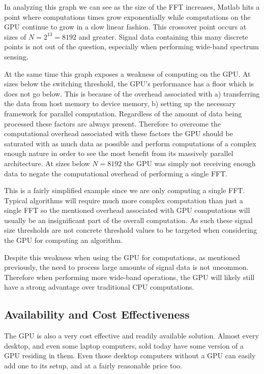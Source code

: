 In analyzing this graph we can see as the size of the FFT increases, Matlab hits a point where computations times grow exponentially while computations on the GPU continue to grow in a slow linear fashion.  This crossover point occurs at sizes of $N = 2^{13} = 8192$ and greater.  Signal data containing this many discrete points is not out of the question, especially when performing wide-band spectrum sensing.  

At the same time this graph exposes a weakness of computing on the GPU.  At sizes below the switching threshold, the GPU's performance has a floor which is does not go below.  This is because of the overhead associated with a) transferring the data from host memory to device memory, b) setting up the necessary framework for parallel computation.  Regardless of the amount of data being processed these factors are always present. Therefore to overcome the computational overhead associated with these factors the GPU should be saturated with as much data as possible and perform computations of a complex enough nature in order to see the most benefit from its massively parallel architecture.  At sizes below $N = 8192$ the GPU was simply not receiving enough data to negate the computational overhead of performing a single FFT.

This is a fairly simplified example since we are only computing a single FFT.  Typical algorithms will require much more complex computation than just a single FFT so the mentioned overhead associated with GPU computations will usually be an insignificant part of the overall computation.  As such these signal size thresholds are not concrete threshold values to be targeted when considering the GPU for computing an algorithm.

Despite this weakness when using the GPU for computations, as mentioned previously, the need to process large amounts of signal data is not uncommon.  Therefore when performing more wide-band operations, the GPU will likely still have a strong advantage over traditional CPU computations.

\subsection{Availability and Cost Effectiveness}
The GPU is also a very cost effective and readily available solution.  Almost every desktop, and even some laptop computers, sold today have some version of a GPU residing in them.  Even those desktop computers without a GPU can easily add one to its setup, and at a fairly reasonable price too.  


